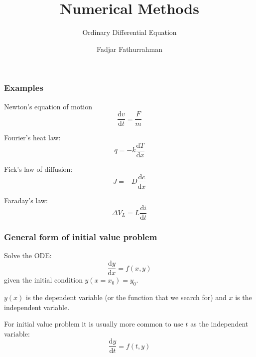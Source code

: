 



\title{Numerical Methods}
\subtitle{Ordinary Differential Equation}
\author{Fadjar Fathurrahman}
\date{}


\frame{\titlepage}


\begin{frame}
\frametitle{Examples}

Newton's equation of motion
\begin{equation*}
\frac{\mathrm{d}v}{\mathrm{d}t} = \frac{F}{m}
\end{equation*}

Fourier's heat law:
\begin{equation*}
q = -k \frac{\mathrm{d}T}{\mathrm{d}x}
\end{equation*}

Fick's law of diffusion:
\begin{equation*}
J = -D \frac{\mathrm{d}c}{\mathrm{d}x}
\end{equation*}

Faraday's law:
\begin{equation*}
\Delta V_{L} = L \frac{\mathrm{d}i}{\mathrm{d}t}
\end{equation*}

\end{frame}


\begin{frame}
\frametitle{General form of initial value problem}

Solve the ODE:
\begin{equation}
\frac{\mathrm{d}y}{\mathrm{d}x} = f(x,y)
\label{eq:ode_gen01}
\end{equation}
given the initial condition $y(x=x_0) = y_0$.

$y(x)$ is the dependent variable (or the function that we search for)
and $x$ is the independent variable.

For initial value problem it is usually
more common to use $t$ as the independent variable:
\begin{equation}
\frac{\mathrm{d}y}{\mathrm{d}t} = f(t,y)
\label{eq:ode_gen02}
\end{equation}

\end{frame}


